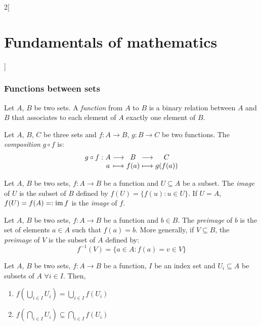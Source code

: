 \documentclass[../../../main.tex]{subfiles}
\begin{document}
\begin{multicols}{2}[\section{Fundamentals of mathematics}]
  \subsubsection{Functions between sets}
  \begin{definition}
    Let $A$, $B$ be two sets. A \emph{function} from $A$ to $B$ is a binary relation between $A$ and $B$ that associates to each element of $A$ exactly one element of $B$.
  \end{definition}
  \begin{definition}
    Let $A$, $B$, $C$ be three sets and $f:A\rightarrow B$, $g:B\rightarrow C$ be two functions. The \emph{composition} $g\circ f$ is:
    $$\begin{array}{r@{\hspace{0.5\tabcolsep}}c@{\hspace{0.5\tabcolsep}}c@{\hspace{0.5\tabcolsep}}c@{\hspace{0.5\tabcolsep}}c@{\hspace{0.5\tabcolsep}}c}
        g\circ f: & A & \longrightarrow & B    & \longrightarrow & C       \\
                  & a & \longmapsto     & f(a) & \longmapsto     & g(f(a))
      \end{array}$$
  \end{definition}
  \begin{definition}
    Let $A$, $B$ be two sets, $f:A\rightarrow B$ be a function and $U\subseteq A$ be a subset. The \emph{image} of $U$ is the subset of $B$ defined by $f(U)=\{f(u): u\in U\}$. If $U=A$, $f(U)=f(A)=:\operatorname{im} f$ is the \emph{image} of $f$.
  \end{definition}
  \begin{definition}
    Let $A$, $B$ be two sets, $f:A\rightarrow B$ be a function and $b\in B$. The \emph{preimage} of $b$ is the set of elements $a\in A$ such that $f(a)=b$. More generally, if $V\subseteq B$, the \emph{preimage} of $V$ is the subset of $A$ defined by: $$f^{-1}(V)=\{a\in A: f(a)=v\in V\}$$
  \end{definition}
  \begin{proposition}
    Let $A$, $B$ be two sets, $f:A\rightarrow B$ be a function, $I$ be an index set and $U_i\subseteq A$ be subsets of $A$ $\forall i\in I$. Then,
    \begin{enumerate}
      \item $f\left(\bigcup_{i\in I}U_i\right)=\bigcup_{i\in I}f(U_i)$
      \item $f\left(\bigcap_{i\in I}U_i\right)\subseteq\bigcap_{i\in I}f(U_i)$

\end{enumerate}
\end{proposition}
\end{multicols}
\end{document}
